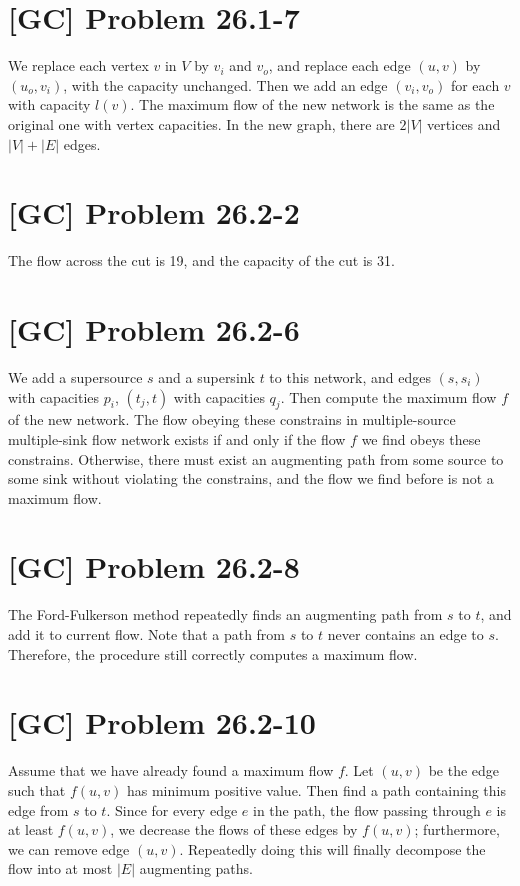 \documentclass[a4paper,11pt,twocolumn]{article}
\begin{document}
  \section{[GC] Problem 26.1-7}
  We replace each vertex $v$ in $V$ by $v_i$ and $v_o$, and replace each edge $(u, v)$ by $(u_o, v_i)$, with the capacity unchanged. Then we add an edge $(v_i, v_o)$ for each $v$ with capacity $l(v)$. The maximum flow of the new network is the same as the original one with vertex capacities. In the new graph, there are $2|V|$ vertices and $|V|+|E|$ edges.

  \section{[GC] Problem 26.2-2}
  The flow across the cut is 19, and the capacity of the cut is 31.

  \section{[GC] Problem 26.2-6}
  We add a supersource $s$ and a supersink $t$ to this network, and edges $(s, s_i)$ with capacities $p_i$, $(t_j, t)$ with capacities $q_j$. Then compute the maximum flow $f$ of the new network. The flow obeying these constrains in multiple-source multiple-sink flow network exists if and only if the flow $f$ we find obeys these constrains. Otherwise, there must exist an augmenting path from some source to some sink without violating the constrains, and the flow we find before is not a maximum flow.

  \section{[GC] Problem 26.2-8}
  The Ford-Fulkerson method repeatedly finds an augmenting path from $s$ to $t$, and add it to current flow. Note that a path from $s$ to $t$ never contains an edge to $s$. Therefore, the procedure still correctly computes a maximum flow.

  \section{[GC] Problem 26.2-10}
  Assume that we have already found a maximum flow $f$. Let $(u, v)$ be the edge such that $f(u, v)$ has minimum positive value. Then find a path containing this edge from $s$ to $t$. Since for every edge $e$ in the path, the flow passing through $e$ is at least $f(u, v)$, we decrease the flows of these edges by $f(u, v)$; furthermore, we can remove edge $(u, v)$. Repeatedly doing this will finally decompose the flow into at most $|E|$ augmenting paths.
\end{document}
